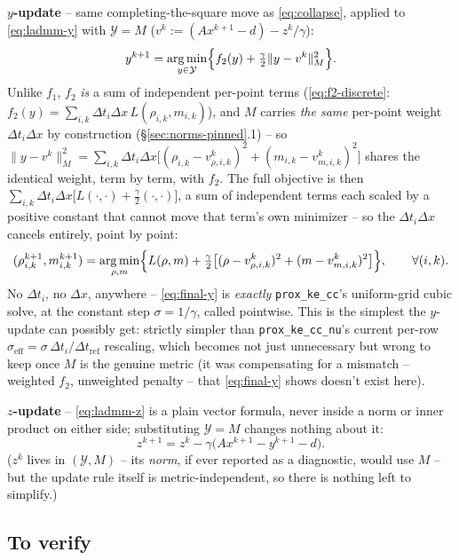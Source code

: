 \documentclass[11pt]{article}
\newcommand{\dt}{\Delta t}
\newcommand{\dx}{\Delta x}
\newcommand{\code}[1]{\texttt{#1}}
\DeclareMathOperator*{\argmin}{arg\,min}
\begin{document}
\textbf{$y$-update} -- same completing-the-square move as \eqref{eq:collapse}, applied to
\eqref{eq:ladmm-y} with $\mathcal Y=M$ ($v^k:=(Ax^{k+1}-d)-z^k/\gamma$):
\[
  y^{k+1} = \argmin_{y\in\mathcal Y}\Bigl\{f_2(y)+\tfrac\gamma2\|y-v^k\|_M^2\Bigr\}.
\]
Unlike $f_1$, $f_2$ \emph{is} a sum of independent per-point terms
(\eqref{eq:f2-discrete}: $f_2(y)=\sum_{i,k}\dt_i\dx\,L(\rho_{i,k},m_{i,k})$), and $M$
carries \emph{the same} per-point weight $\dt_i\dx$ by construction (\S\ref{sec:norms-pinned}.1)
-- so $\|y-v^k\|_M^2=\sum_{i,k}\dt_i\dx\big[(\rho_{i,k}-v^k_{\rho,i,k})^2+(m_{i,k}-v^k_
{m,i,k})^2\big]$ shares the identical weight, term by term, with $f_2$. The full objective
is then $\sum_{i,k}\dt_i\dx\big[L(\cdot,\cdot)+\tfrac\gamma2(\cdot,\cdot)\big]$, a sum of
independent terms each scaled by a positive constant that cannot move that term's own
minimizer -- so the $\dt_i\dx$ cancels entirely, point by point:
\begin{equation}
  \label{eq:final-y}
  (\rho^{k+1}_{i,k},m^{k+1}_{i,k}) = \argmin_{\rho,m}\Bigl\{L(\rho,m)+\tfrac\gamma2\bigl[
  (\rho-v^k_{\rho,i,k})^2+(m-v^k_{m,i,k})^2\bigr]\Bigr\}, \qquad \forall (i,k).
\end{equation}
No $\dt_i$, no $\dx$, anywhere -- \eqref{eq:final-y} is \emph{exactly}
\code{prox\_ke\_cc}'s uniform-grid cubic solve, at the constant step $\sigma=1/\gamma$,
called pointwise. This is the simplest the $y$-update can possibly get: strictly simpler
than \code{prox\_ke\_cc\_nu}'s current per-row $\sigma_{\mathrm{eff}}=\sigma\,\dt_i/\dt_
{\mathrm{ref}}$ rescaling, which becomes not just unnecessary but wrong to keep once $M$
is the genuine metric (it was compensating for a mismatch -- weighted $f_2$, unweighted
penalty -- that \eqref{eq:final-y} shows doesn't exist here).

\textbf{$z$-update} -- \eqref{eq:ladmm-z} is a plain vector formula, never inside a norm
or inner product on either side; substituting $\mathcal Y=M$ changes nothing about it:
\begin{equation}
  \label{eq:final-z}
  z^{k+1} = z^k-\gamma\bigl(Ax^{k+1}-y^{k+1}-d\bigr).
\end{equation}
($z^k$ lives in $(\mathcal Y,M)$ -- its \emph{norm}, if ever reported as a diagnostic,
would use $M$ -- but the update rule itself is metric-independent, so there is nothing
left to simplify.)

\subsection*{To verify}
\end{document}
